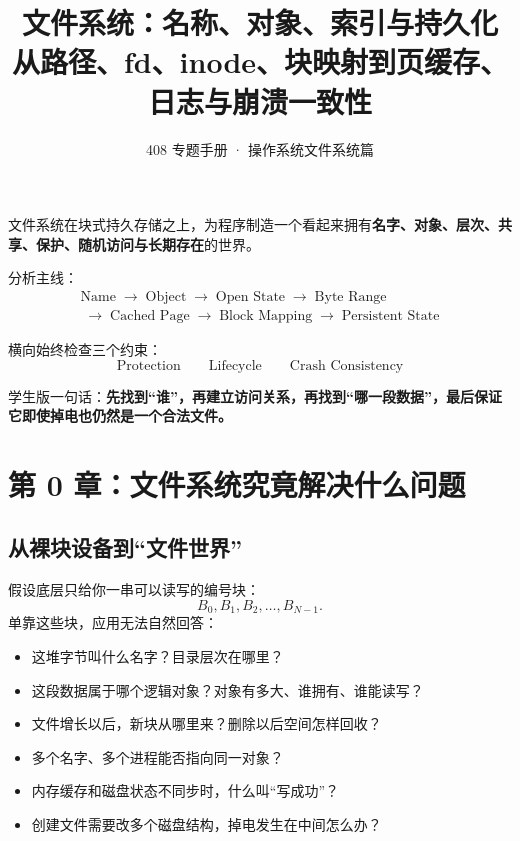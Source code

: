\documentclass[11pt,a4paper]{ctexart}
\title{\vspace{-1.2cm}\textbf{文件系统：名称、对象、索引与持久化}\\[0.35em]
\large 从路径、fd、inode、块映射到页缓存、日志与崩溃一致性}
\author{408 专题手册 · 操作系统文件系统篇}
\date{}
\newcommand{\kw}[1]{\textbf{#1}}
\newcommand{\arr}{\;\longrightarrow\;}
\begin{document}
\maketitle

\begin{corebox}
文件系统在块式持久存储之上，为程序制造一个看起来拥有\kw{名字、对象、层次、共享、保护、随机访问与长期存在}的世界。

分析主线：
\[
\boxed{\begin{aligned}
\text{Name}\arr\text{Object}\arr\text{Open State}\arr\text{Byte Range}\\
\arr\text{Cached Page}\arr\text{Block Mapping}\arr\text{Persistent State}
\end{aligned}}
\]

横向始终检查三个约束：
\[
\boxed{\text{Protection}}\qquad
\boxed{\text{Lifecycle}}\qquad
\boxed{\text{Crash Consistency}}
\]

学生版一句话：\kw{先找到“谁”，再建立访问关系，再找到“哪一段数据”，最后保证它即使掉电也仍然是一个合法文件。}
\end{corebox}

\tableofcontents
\newpage

\section{第 0 章：文件系统究竟解决什么问题}

\subsection{从裸块设备到“文件世界”}
假设底层只给你一串可以读写的编号块：
\[
B_0,B_1,B_2,\ldots,B_{N-1}.
\]
单靠这些块，应用无法自然回答：
\begin{itemize}
  \item 这堆字节叫什么名字？目录层次在哪里？
  \item 这段数据属于哪个逻辑对象？对象有多大、谁拥有、谁能读写？
  \item 文件增长以后，新块从哪里来？删除以后空间怎样回收？
  \item 多个名字、多个进程能否指向同一对象？
  \item 内存缓存和磁盘状态不同步时，什么叫“写成功”？
  \item 创建文件需要改多个磁盘结构，掉电发生在中间怎么办？
\end{itemize}
\end{document}
